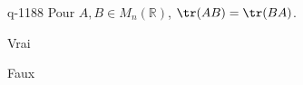 \begin{truefalse}{q-1188}
Pour $A,B\in M_n(\mathbb{R})$, $\tr(AB)=\tr(BA)$.
\item* Vrai
\item Faux
\end{truefalse}

